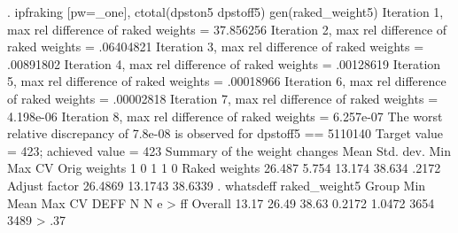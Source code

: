 {\smallskip}
. ipfraking [pw=_one], ctotal(dpston5 dpstoff5) gen(raked_weight5)
{\smallskip}
 Iteration 1, max rel difference of raked weights = 37.856256
 Iteration 2, max rel difference of raked weights = .06404821
 Iteration 3, max rel difference of raked weights = .00891802
 Iteration 4, max rel difference of raked weights = .00128619
 Iteration 5, max rel difference of raked weights = .00018966
 Iteration 6, max rel difference of raked weights = .00002818
 Iteration 7, max rel difference of raked weights = 4.198e-06
 Iteration 8, max rel difference of raked weights = 6.257e-07
The worst relative discrepancy of  7.8e-08 is observed for dpstoff5 == 5110140     
Target value =        423; achieved value =        423
{\smallskip}
   Summary of the weight changes
{\smallskip}
              {\VBAR}    Mean    Std. dev.    Min        Max       CV
Orig weights  {\VBAR}        1          0         1           1       0
Raked weights {\VBAR}   26.487      5.754    13.174      38.634   .2172
Adjust factor {\VBAR}  26.4869              13.1743     38.6339
{\smallskip}
. whatsdeff raked_weight5
{\smallskip}
    Group     {\VBAR}   Min     {\VBAR}   Mean    {\VBAR}   Max     {\VBAR}    CV   {\VBAR}   DEFF  {\VBAR}   N   {\VBAR}  N e
> ff
      Overall {\VBAR}     13.17 {\VBAR}     26.49 {\VBAR}     38.63 {\VBAR}  0.2172 {\VBAR}  1.0472 {\VBAR}  3654 {\VBAR} 3489
> .37
{\smallskip}
